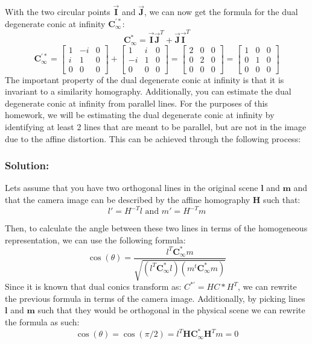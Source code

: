 \documentclass{article}
\begin{document}
With the two circular points $\boldsymbol{\Vec{I}}$ and $\boldsymbol{\Vec{J}}$, we can now get the formula for the dual degenerate conic at infinity $\boldsymbol{C_\infty^{'*}}$:
\[\boldsymbol{C_\infty^{*}} = \boldsymbol{\Vec{I}} \boldsymbol{\Vec{J}} ^ T + \boldsymbol{\Vec{J}} \boldsymbol{\Vec{I}}^T\]
\[\boldsymbol{C_\infty^{'*}} = \begin{bmatrix}
    1 & -i & 0 \\
    i & 1 & 0 \\
    0 & 0 & 0
\end{bmatrix} + \begin{bmatrix}
    1 & i & 0 \\
    -i & 1 & 0 \\
    0 & 0 & 0
\end{bmatrix} = \begin{bmatrix}
    2 & 0 & 0 \\
    0 & 2 & 0 \\
    0 & 0 & 0
\end{bmatrix} = \begin{bmatrix}
    1 & 0 & 0 \\
    0 & 1 & 0 \\
    0 & 0 & 0
\end{bmatrix}\]
The important property of the dual degenerate conic at infinity is that it is invariant to a similarity homography. Additionally, you can estimate the dual degenerate conic at infinity from parallel lines. For the purposes of this homework, we will be estimating the dual degenerate conic at infinity by identifying at least 2 lines that are meant to be parallel, but are not in the image due to the affine distortion. This can be achieved through the following process:

\subsubsection{Solution:} \label{sec:circ-points}
Lets assume that you have two orthogonal lines in the original scene $\boldsymbol{l}$ and $\boldsymbol{m}$ and that the camera image can be described by the affine homography $\boldsymbol{H}$ such that:
\[l' = H ^{-T} l \text{ and } m' = H ^{-T} m\]

Then, to calculate the angle between these two lines in terms of the homogeneous representation, we can use the following formula:
\[\cos(\theta) = \frac{l^T \boldsymbol{C_\infty^{*}} m}{\sqrt{\left(l^T \boldsymbol{C_\infty^{*}} l\right) \left(m^t \boldsymbol{C_\infty^{*}} m\right)}}\]
Since it is known that dual conics transform as: \(C^{*'} = H C* H^{T}\), we can rewrite the previous formula in terms of the camera image. Additionally, by picking lines $\boldsymbol{l}$ and $\boldsymbol{m}$ such that they would be orthogonal in the physical scene we can rewrite the formula as such:
\[\cos(\theta) = \cos(\pi/2) = l^T \boldsymbol{H} \boldsymbol{C_\infty^{*}} \boldsymbol{H}^T m = 0\]
\end{document}
